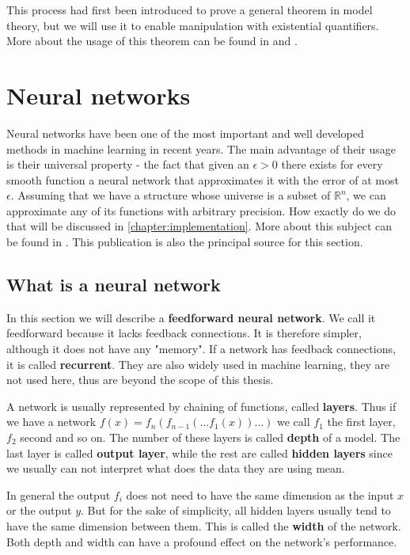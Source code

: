 This process had first been introduced to prove a general theorem in model theory, but we will use it to enable manipulation with existential quantifiers. More about the usage of this theorem can be found in \cite{logic} and \cite{model}.


\section{Neural networks}
Neural networks have been one of the most important and well developed methods in machine learning in recent years. The main advantage of their usage is their universal property - the fact that given an $\epsilon>0$ there exists for every smooth function a neural network that approximates it with the error of at most $\epsilon$. Assuming that we have a structure whose universe is a subset of $\mathbb{R}^n$, we can approximate any of its functions with arbitrary precision. How exactly do we do that will be discussed in \autoref{chapter:implementation}. More about this subject can be found in \cite{neural}. This publication is also the principal source for this section.

\subsection{What is a neural network}
In this section we will describe a \textbf{feedforward neural network}. We call it feedforward because it lacks feedback connections. It is therefore simpler, although it does not have any "memory". If a network has feedback connections, it is called \textbf{recurrent}. They are also widely used in machine learning, they are not used here, thus are beyond the scope of this thesis.

A network is usually represented by chaining of functions, called \textbf{layers}. Thus if we have a network $f(x)=f_n(f_{n-1}(\dots f_1(x))\dots)$ we call $f_1$ the first layer, $f_2$ second and so on. The number of these layers is called \textbf{depth} of a model. The last layer is called \textbf{output layer}, while the rest are called \textbf{hidden layers} since we usually can not interpret what does the data they are using mean.

In general the output $f_i$ does not need to have the same dimension as the input $x$ or the output $y$. But for the sake of simplicity, all hidden layers usually tend to have the same dimension between them. This is called the \textbf{width} of the network. Both depth and width can have a profound effect on the network's performance. 

